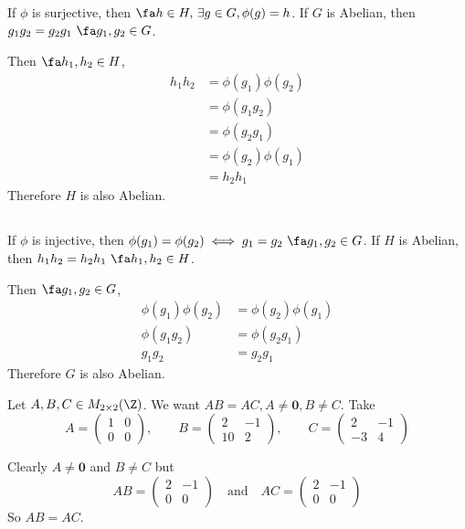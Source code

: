 \documentclass[a4paper]{article}
\begin{document}
If $\phi$ is surjective, then $\fa h \in H,\, \exists g \in G, \phi(g) = h$. If $G$ is Abelian, then $g_1 g_2 = g_2 g_1\ \fa g_1, g_2 \in G$.

Then $\fa h_1, h_2 \in H$, \begin{align*}
	h_1 h_2 &= \phi(g_1) \phi(g_2)\\[1ex]
					 &= \phi(g_1 g_2)\\[1ex]
					 &= \phi(g_2 g_1)\\[1ex]
					 &= \phi(g_2) \phi(g_1)\\[1ex]
					 &= h_2 h_1
\end{align*}
Therefore $H$ is also Abelian.

\subsection{}

If $\phi$ is injective, then $\phi(g_1) = \phi(g_2) \iff g_1 = g_2\ \fa g_1, g_2 \in G$. If $H$ is Abelian, then $h_1 h_2 = h_2 h_1\ \fa h_1, h_2 \in H$.

Then $\fa g_1, g_2 \in G$, \begin{align*}
	\phi(g_1) \phi(g_2) &= \phi(g_2) \phi(g_1)\\[1ex]
	\phi(g_1 g_2) &= \phi(g_2 g_1)\\[1ex]
	g_1 g_2 &= g_2 g_1
\end{align*}
Therefore $G$ is also Abelian.


Let $A, B, C \in M_{2 \times 2}(\Z)$. We want $AB = AC, A \ne \mathbf 0, B \ne C$. Take $$A = \begin{pmatrix}1 & 0\\ 0 & 0\end{pmatrix}, \qquad B = \begin{pmatrix}2 & -1\\ 10 & 2\end{pmatrix}, \qquad C = \begin{pmatrix}2 & -1\\ -3 & 4\end{pmatrix}$$

Clearly $A \ne \mathbf 0$ and $B \ne C$ but $$AB = \begin{pmatrix}2 & -1\\ 0 & 0\end{pmatrix} \quad \text{and} \quad AC = \begin{pmatrix}2 & -1\\ 0 & 0\end{pmatrix}$$
So $AB = AC$.
\end{document}
